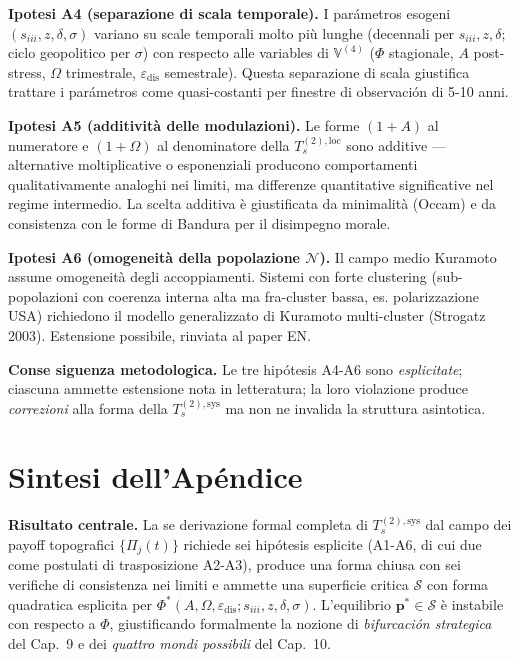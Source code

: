 \Conj{} \textbf{Ipotesi A4 (separazione di scala temporale).} I
parámetros esogeni \((s_{iii}, z, \delta, \sigma)\) variano su scale
temporali molto più lunghe (decennali per \(s_{iii}, z, \delta\); ciclo
geopolitico per \(\sigma\)) con respecto alle variables di
\(\mathbb{V}^{(4)}\) (\(\Phi\) stagionale, \(A\) post-stress, \(\Omega\)
trimestrale, \(\varepsilon_{\text{dis}}\) semestrale). Questa
separazione di scala giustifica trattare i parámetros come quasi-costanti
per finestre di observación di 5-10 anni.

\Conj{} \textbf{Ipotesi A5 (additività delle modulazioni).} Le forme
\((1+A)\) al numeratore e \((1+\Omega)\) al denominatore della
\(T_s^{(2),\text{loc}}\) sono additive --- alternative moltiplicative o
esponenziali producono comportamenti qualitativamente analoghi nei
limiti, ma differenze quantitative significative nel regime intermedio.
La scelta additiva è giustificata da minimalità (Occam) e da consistenza
con le forme di Bandura per il disimpegno morale.

\Conj{} \textbf{Ipotesi A6 (omogeneità della popolazione
\(\mathcal{N}\)).} Il campo medio Kuramoto assume omogeneità degli
accoppiamenti. Sistemi con forte clustering (sub-popolazioni con
coerenza interna alta ma fra-cluster bassa, es. polarizzazione USA)
richiedono il modello generalizzato di Kuramoto multi-cluster (Strogatz
2003). Estensione possibile, rinviata al paper EN.

\Proved{} \textbf{Conse siguenza metodologica.} Le tre hipótesis A4-A6 sono
\emph{esplicitate}; ciascuna ammette estensione nota in letteratura; la
loro violazione produce \emph{correzioni} alla forma della
\(T_s^{(2),\text{sys}}\) ma non ne invalida la struttura asintotica.



\section{Sintesi dell'Apéndice}\label{sintesi-dellapéndice}

\Proved{} \textbf{Risultato centrale.} La se derivazione formal completa
di \(T_s^{(2),\text{sys}}\) dal campo dei payoff topografici
\(\{\Pi_j(t)\}\) richiede sei hipótesis esplicite (A1-A6, di cui due come
postulati di trasposizione A2-A3), produce una forma chiusa con sei
verifiche di consistenza nei limiti e ammette una superficie critica
\(\mathcal{S}\) con forma quadratica esplicita per
\(\Phi^*(A, \Omega, \varepsilon_{\text{dis}}; s_{iii}, z, \delta, \sigma)\).
L'equilibrio \(\boldsymbol{p}^* \in \mathcal{S}\) è instabile con respecto a
\(\Phi\), giustificando formalmente la nozione di \emph{bifurcación
strategica} del Cap.~9 e dei \emph{quattro mondi possibili} del Cap.~10.

